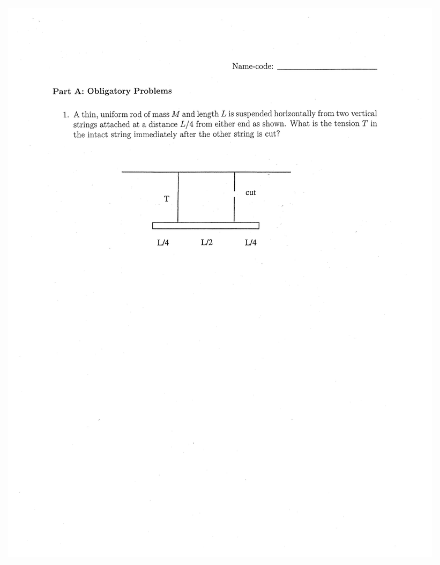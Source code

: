 \documentclass[10pt,a4paper]{article}
\begin{document}
\begin{figure}[H]
 \centering
 \includegraphics[width=16cm]{pdf/1-1T54.png}
\end{figure}
 \newpage
\end{document}
